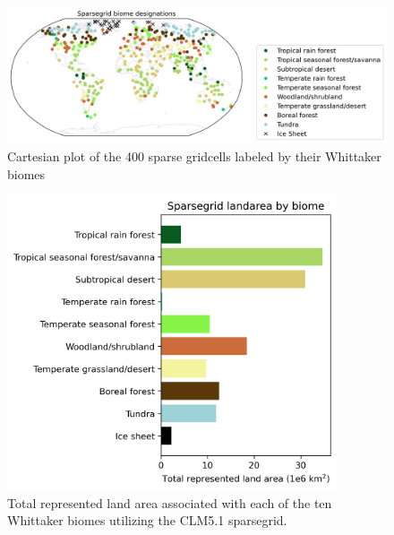 \documentclass[11pt]{article}
\begin{document}
\begin{figure}[h]
\centering
\includegraphics[width=40pc]{figs/supp/biome_latlon.png}
\caption{Cartesian plot of the 400 sparse gridcells labeled by their Whittaker biomes}
\label{supp:whit2}
\end{figure}


\begin{figure}[h]
\centering
\includegraphics[width=23pc]{figs/supp/biome_areas.png}
\caption{Total represented land area associated with each of the ten Whittaker biomes utilizing the CLM5.1 sparsegrid.}
\label{supp:whit3}
\end{figure}
\end{document}
